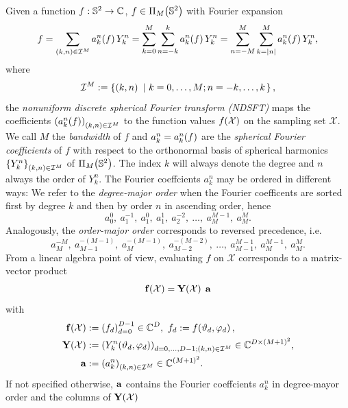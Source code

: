 Given a function $f: \mathbb{S}^2 \rightarrow \mathbb{C}$, $f \in \Pi_{M}{\hspace{-0.4ex}}\left(\mathbb{S}^2\right)$ with Fourier expansion
\begin{equation}
  \label{NFSFT:FourierExpansion} 
  f = \sum_{\left(k,n\right) \in\mathcal{I}^M} a_k^n{\hspace{-0.4ex}}\left(f\right) Y_{k}^n = \sum_{k=0}^M \sum_{n=-k}^k a_k^n{\hspace{-0.4ex}}\left(f\right) Y_{k}^n = \sum_{n=-M}^M \sum_{k=\left\vert n\right\vert}^M a_k^n{\hspace{-0.4ex}}\left(f\right) Y_{k}^n,
\end{equation}  
where 
\[\mathcal{I}^M := \left\{\left(k,n\right)\ \left|\ k=0,\ldots,M;n=-k,\ldots,k\right.\right\rbrace,\]
the \emph{nonuniform discrete spherical Fourier transform (NDSFT)} maps the coefficients $\left(a_k^n{\hspace{-0.4ex}}\left(f\right)\right)_{(k,n) \in \mathcal{I}^M}$ to the function values $f{\hspace{-0.4ex}}\left(\mathcal{X}\right)$ on the sampling set $\mathcal{X}$.
We call $M$ the \emph{bandwidth} of $f$ and $a_{k}^n = a_{k}^n{\hspace{-0.4ex}}\left(f\right)$ are the \emph{spherical Fourier coefficients} of $f$ with respect to the 
orthonormal basis of spherical harmonics $\left\{Y_{k}^n\right\rbrace_{\left(k,n\right) \in\mathcal{I}^M}$ of $\Pi_{M}{\hspace{-0.4ex}}\left(\mathbb{S}^2\right)$. The index $k$ will always denote the degree and $n$ always the order of $Y_{k}^n$. The Fourier coeffcients $a_{k}^n$ may be ordered 
in different ways: We refer to the \emph{degree-major order} when the Fourier coefficents are sorted first by degree $k$ and then by order $n$ in ascending order, hence
\[ a_{0}^0,\: a_{1}^{-1},\: a_{1}^{0},\: a_{1}^{1},\: a_{2}^{-2},\: \ldots,\: a_{M}^{M-1},\: a_{M}^{M}.\] 
Analogously, the \emph{order-major order} corresponds to reversed precedence, i.e.
\[ a_{M}^{-M},\: a_{M-1}^{-(M-1)},\: a_{M}^{-(M-1)},\: a_{M-2}^{-(M-2)},\: \ldots,\: a_{M-1}^{M-1},\: a_{M}^{M-1},\: a_{M}^{M}.\] 
From a linear algebra point of view, evaluating $f$ on $\mathcal{X}$ corresponds to a matrix-vector product
\[ \mathbf{f}{\hspace{-0.4ex}}\left(\mathcal{X}\right) = \mathbf{Y}{\hspace{-0.4ex}}\left(\mathcal{X}\right) \; \mathbf{a}\]
with
\begin{equation}
  \nonumber
  \begin{split}
    \mathbf{f}{\hspace{-0.4ex}}\left(\mathcal{X}\right) & := \left(f_d\right)_{d=0}^{D-1} \in \mathbb{C}^{D},\ f_{d} := f{\hspace{-0.4ex}}\left(\vartheta_{d},\varphi_{d}\right),\\
    \mathbf{Y}{\hspace{-0.4ex}}\left(\mathcal{X}\right) & := \left(Y_k^n{\hspace{-0.4ex}}\left(\vartheta_d,\varphi_d\right)\right)_{d=0,\ldots,D-1; \left(k,n\right) \in \mathcal{I}^M} \in \mathbb{C}^{D \times \left(M+1\right)^2},\\
    \mathbf{a} & := \left(a_k^n\right)_{\left(k,n\right) \in \mathcal{I}^M} \in \mathbb{C}^{\left(M+1\right)^2}.
  \end{split}
\end{equation}
If not specified otherwise, $\mathbf{a}$ contains the Fourier coeffcients $a_{k}^n$ in degree-mayor order and the columns of $\mathbf{Y}{\hspace{-0.4ex}}\left(\mathcal{X}\right)$ 
